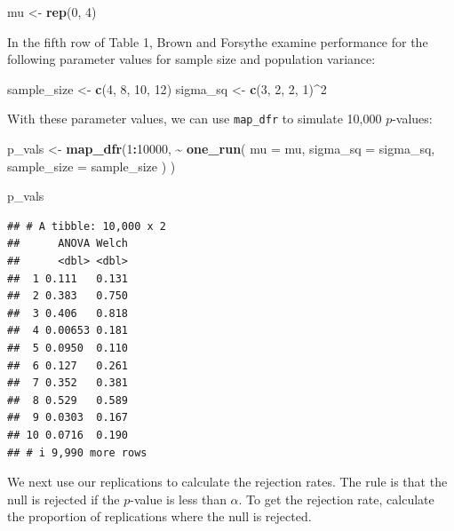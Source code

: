 \documentclass[
]{book}
\newenvironment{Shaded}{\begin{snugshade}}{\end{snugshade}}
\newcommand{\AttributeTok}[1]{\textcolor[rgb]{0.13,0.29,0.53}{#1}}
\newcommand{\DecValTok}[1]{\textcolor[rgb]{0.00,0.00,0.81}{#1}}
\newcommand{\FunctionTok}[1]{\textcolor[rgb]{0.13,0.29,0.53}{\textbf{#1}}}
\newcommand{\NormalTok}[1]{#1}
\newcommand{\OtherTok}[1]{\textcolor[rgb]{0.56,0.35,0.01}{#1}}
\newcommand{\SpecialCharTok}[1]{\textcolor[rgb]{0.81,0.36,0.00}{\textbf{#1}}}
\begin{document}
\begin{Shaded}
\begin{Highlighting}[]
\NormalTok{mu }\OtherTok{\textless{}{-}} \FunctionTok{rep}\NormalTok{(}\DecValTok{0}\NormalTok{, }\DecValTok{4}\NormalTok{)}
\end{Highlighting}
\end{Shaded}

In the fifth row of Table 1, Brown and Forsythe examine performance for the following parameter values for sample size and population variance:

\begin{Shaded}
\begin{Highlighting}[]
\NormalTok{sample\_size }\OtherTok{\textless{}{-}} \FunctionTok{c}\NormalTok{(}\DecValTok{4}\NormalTok{, }\DecValTok{8}\NormalTok{, }\DecValTok{10}\NormalTok{, }\DecValTok{12}\NormalTok{)}
\NormalTok{sigma\_sq }\OtherTok{\textless{}{-}} \FunctionTok{c}\NormalTok{(}\DecValTok{3}\NormalTok{, }\DecValTok{2}\NormalTok{, }\DecValTok{2}\NormalTok{, }\DecValTok{1}\NormalTok{)}\SpecialCharTok{\^{}}\DecValTok{2}
\end{Highlighting}
\end{Shaded}

With these parameter values, we can use \texttt{map\_dfr} to simulate 10,000 \(p\)-values:

\begin{Shaded}
\begin{Highlighting}[]
\NormalTok{p\_vals }\OtherTok{\textless{}{-}} \FunctionTok{map\_dfr}\NormalTok{(}\DecValTok{1}\SpecialCharTok{:}\DecValTok{10000}\NormalTok{, }
  \SpecialCharTok{\textasciitilde{}} \FunctionTok{one\_run}\NormalTok{(}
      \AttributeTok{mu =}\NormalTok{ mu,}
      \AttributeTok{sigma\_sq =}\NormalTok{ sigma\_sq,}
      \AttributeTok{sample\_size =}\NormalTok{ sample\_size}
\NormalTok{    ) }
\NormalTok{)}

\NormalTok{p\_vals}
\end{Highlighting}
\end{Shaded}

\begin{verbatim}
## # A tibble: 10,000 x 2
##      ANOVA Welch
##      <dbl> <dbl>
##  1 0.111   0.131
##  2 0.383   0.750
##  3 0.406   0.818
##  4 0.00653 0.181
##  5 0.0950  0.110
##  6 0.127   0.261
##  7 0.352   0.381
##  8 0.529   0.589
##  9 0.0303  0.167
## 10 0.0716  0.190
## # i 9,990 more rows
\end{verbatim}

We next use our replications to calculate the rejection rates.
The rule is that the null is rejected if the \(p\)-value is less than \(\alpha\). To get the rejection rate, calculate the proportion of replications where the null is rejected.
\end{document}
